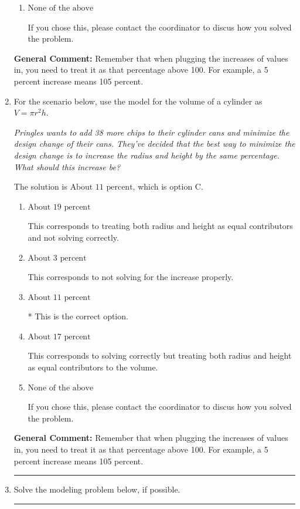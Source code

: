 \documentclass{extbook}[14pt]
\newcommand{\litem}[1]{\item #1

\rule{\textwidth}{0.4pt}}
\begin{document}
\begin{enumerate}
{\begin{enumerate}[label=\Alph*.]
This corresponds to treating both radius and height as equal contributors and not solving correctly.
\item \( \text{None of the above} \)

If you chose this, please contact the coordinator to discus how you solved the problem.
\end{enumerate}

\textbf{General Comment:} Remember that when plugging the increases of values in, you need to treat it as that percentage above 100. For example, a 5 percent increase means 105 percent.
}
\litem{
For the scenario below, use the model for the volume of a cylinder as $V = \pi r^2 h$.

\begin{center}
    \textit{ Pringles wants to add 38 \text{percent} more chips to their cylinder cans and minimize the design change of their cans. They've decided that the best way to minimize the design change is to increase the radius and height by the same percentage. What should this increase be? }
\end{center}
The solution is \( \text{About } 11 \text{ percent} \), which is option C.\begin{enumerate}[label=\Alph*.]
\item \( \text{About } 19 \text{ percent} \)

This corresponds to treating both radius and height as equal contributors and not solving correctly.
\item \( \text{About } 3 \text{ percent} \)

This corresponds to not solving for the increase properly.
\item \( \text{About } 11 \text{ percent} \)

* This is the correct option.
\item \( \text{About } 17 \text{ percent} \)

This corresponds to solving correctly but treating both radius and height as equal contributors to the volume.
\item \( \text{None of the above} \)

If you chose this, please contact the coordinator to discus how you solved the problem.
\end{enumerate}

\textbf{General Comment:} Remember that when plugging the increases of values in, you need to treat it as that percentage above 100. For example, a 5 percent increase means 105 percent.
}
\litem{
Solve the modeling problem below, if possible.

}
\end{enumerate}
\end{document}
